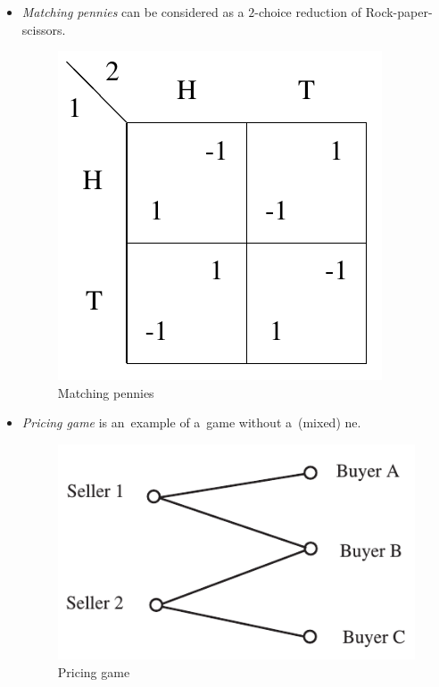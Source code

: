 \begin{itemize}
  \item \emph{Matching pennies} can be considered as a $2$-choice reduction of Rock-paper-scissors.

    \begin{figure}[H]
      \centering
      \includegraphics[width=\widthratio\paperwidth]{../img/matching-pennies.png}
      \caption{Matching pennies}
      \label{fig:matching-pennies}
    \end{figure}

  \item \emph{Pricing game} is an~example of a~game without a~(mixed) \acrshort{ne}.

    \begin{figure}[H]
      \centering
      \includegraphics[width=\widthratio\paperwidth]{../img/pricing-game.png}
      \caption{Pricing game}
      \label{fig:pricing-game}
    \end{figure}


\end{itemize}
